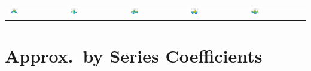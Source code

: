 \documentclass[11pt,compress,xcolor={usenames,dvipsnames},aspectratio=169]{beamer}
\begin{document}
\begin{frame}
\begin{tabular}{>{\centering}m{}>{\centering}m{}>{\centering}m{}>{\centering}m{}>{\centering}m{}}
\includegraphics[width =0.18\textwidth]{FourierSampling/Chebyshev_Degree_1_1.png}  &
\includegraphics[width =0.18\textwidth]{FourierSampling/Chebyshev_Degree_1_2.png}  &
\includegraphics[width =0.18\textwidth]{FourierSampling/Chebyshev_Degree_1_3.png}  &
\includegraphics[width =0.18\textwidth]{FourierSampling/Chebyshev_Degree_2_2.png}  &
\includegraphics[width =0.18\textwidth]{FourierSampling/Chebyshev_Degree_2_3.png} 
	\end{tabular}
\end{frame}

\section{Approx.\ by Series Coefficients}
\end{document}
